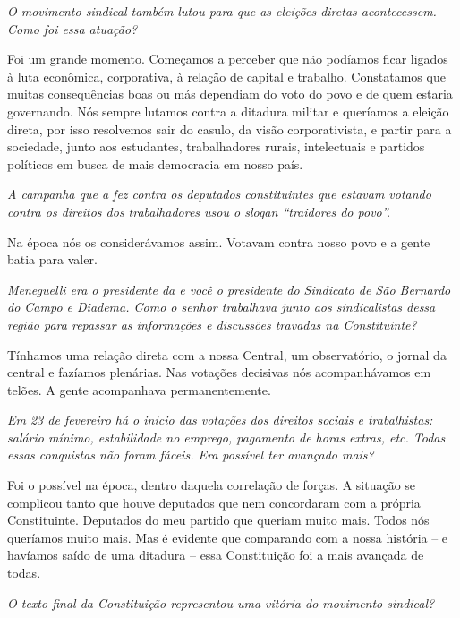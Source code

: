 \medskip

\noindent\emph{O movimento sindical também lutou para que as eleições diretas
acontecessem. Como foi essa atuação?}

Foi um grande momento. Começamos a perceber que não
podíamos ficar ligados à luta econômica, corporativa, à relação de
capital e trabalho. Constatamos que muitas consequências boas ou más
dependiam do voto do povo e de quem estaria governando. Nós sempre
lutamos contra a ditadura militar e queríamos a eleição direta, por isso
resolvemos sair do casulo, da visão corporativista, e partir para a
sociedade, junto aos estudantes, trabalhadores rurais, intelectuais e
partidos políticos em busca de mais democracia em nosso país.

\medskip

\noindent\emph{A campanha que a  fez contra os deputados constituintes que
estavam votando contra os direitos dos trabalhadores usou o slogan
``traidores do povo''.}

Na época nós os considerávamos assim. Votavam
contra nosso povo e a gente batia para valer.

\medskip

\noindent\emph{Meneguelli era o presidente da  e você o presidente do
Sindicato de São Bernardo do Campo e Diadema. Como o senhor trabalhava
junto aos sindicalistas dessa região para repassar as informações e
discussões travadas na Constituinte?}

Tínhamos uma relação direta com a nossa Central, um
observatório, o jornal da central e fazíamos plenárias. Nas votações
decisivas nós acompanhávamos em telões. A gente acompanhava
permanentemente.

\medskip

\noindent\emph{Em 23 de fevereiro há o inicio das votações dos direitos sociais
e trabalhistas: salário mínimo, estabilidade no emprego, pagamento de
horas extras, etc. Todas essas conquistas não foram fáceis. Era
possível ter avançado mais?}

Foi o possível na época, dentro daquela correlação
de forças. A situação se complicou tanto que houve deputados que nem
concordaram com a própria Constituinte. Deputados do meu partido que
queriam muito mais. Todos nós queríamos muito mais. Mas é evidente que
comparando com a nossa história -- e havíamos saído de uma ditadura --
essa Constituição foi a mais avançada de todas.

\medskip

\noindent\emph{O texto final da Constituição representou uma vitória do
movimento sindical?}

